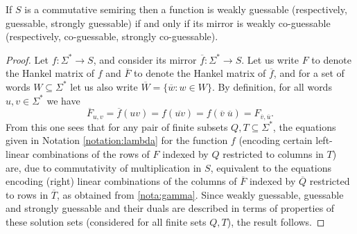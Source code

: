 \documentclass{lmcs}
\numberwithin{theorem}{section}
\begin{document}
\begin{lem}
\label{lem:com2}
If $S$ is a commutative semiring then a function is weakly guessable (respectively, guessable, strongly guessable) if and only if its mirror is weakly co-guessable (respectively, co-guessable, strongly co-guessable).
\end{lem}
\begin{proof}
Let $f: \Sigma^* \rightarrow S$, and consider its mirror $\overline{f}: \Sigma^* \rightarrow S$. Let us write $F$ to denote the Hankel matrix of $f$ and $\overline{F}$ to denote the Hankel matrix of $\overline{f}$, and for a set of words $W \subseteq \Sigma^*$ let us also write $\overline{W} = \{\overline{w}: w \in W\}$. By definition, for all words $u, v \in \Sigma^*$ we have $$\overline{F}_{u,v} = \overline{f}(uv) = f(\overline{uv}) = f(\overline{v} \; \overline{u}) = F_{\overline{v}, \overline{u}}.$$
From this one sees that for any pair of finite subsets $Q, T \subseteq \Sigma^*$, the equations given in Notation \ref{notation:lambda} for the function $f$ (encoding certain left-linear combinations of the rows of $F$ indexed by $Q$ restricted to columns in $T$)
are, due to commutativity of multiplication in $S$, equivalent to the equations  encoding (right) linear combinations of the columns of $\overline{F}$ indexed by $\overline{Q}$ restricted to rows in $\overline{T}$, as obtained from \ref{nota:gamma}. Since weakly guessable, guessable and strongly guessable and their duals are described in terms of properties of these solution sets (considered for all finite sets $Q, T$), the result follows. 
\end{proof}
\end{document}
